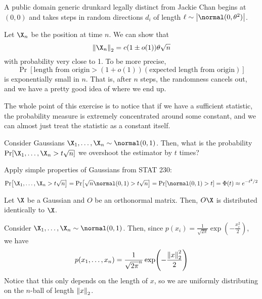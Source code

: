 \documentclass[class=co432,notes,tikz]{agony}
\begin{document}
\begin{example}
  A public domain generic drunkard legally distinct from Jackie Chan begins at $(0,0)$
  and takes steps in random directions $d_i$
  of length $\ell \sim \abs{\normal(0,\theta^2)}$.
\end{example}

Let $\X_n$ be the position at time $n$.
We can show that
\[ \norm{\X_n}_2 = c(1\pm o(1))\theta\sqrt{n} \]
with probability very close to 1. To be more precise,
\[ \Pr[\text{length from origin} > (1+o(1))(\text{expected length from origin})] \]
is exponentially small in $n$.
That is, after $n$ steps, the randomness cancels out,
and we have a pretty good idea of where we end up.

The whole point of this exercise is to notice that if we have a sufficient statistic,
the probability measure is extremely concentrated around some constant,
and we can almost just treat the statistic as a constant itself.

\begin{example}
  Consider \iid Gaussians $\X_1,\dotsc,\X_n \sim \normal(0,1)$.
  Then, what is the probability $\Pr[\X_1,\dotsc,\X_n > t\sqrt{n}]$
  we overshoot the estimator by $t$ times?
\end{example}
\begin{sol}
  Apply simple properties of Gaussians from STAT 230:
  \begin{align*}
    \Pr[\X_1,\dotsc,\X_n > t\sqrt{n}] = \Pr[\sqrt n\normal(0,1) > t\sqrt{n}] = \Pr[\normal(0,1) > t] = \Phi(t) \approx e^{-t^2/2}
  \end{align*}
\end{sol}

\begin{lemma}
  Let $\X$ be a Gaussian and $O$ be an orthonormal matrix.
  Then, $O\X$ is distributed identically to $\X$.
\end{lemma}
\begin{prf}
  Consider \iid $\X_1,\dotsc,\X_n \sim \normal(0,1)$.
  Then, since $p(x_i) = \frac1{\sqrt{2\pi}}\exp(-\frac{x_i^2}{2})$, we have
  \[ p(x_1,\dotsc,x_n) = \frac{1}{\sqrt{2\pi}^n}\exp(-\frac{\norm{x}_2^2}{2}) \]
  Notice that this only depends on the length of $x$,
  so we are uniformly distributing on the $n$-ball of length $\norm{x}_2$.
\end{prf}
\end{document}
